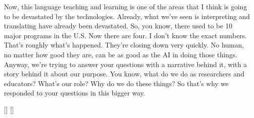 \documentclass[english]{textolivre}
\begin{document}
{    Now, this language teaching and learning is one of the areas that I think is going to be devastated by the technologies. Already, what we’ve seen is interpreting and translating have already been devastated. So, you know, there used to be 10 major programs in the U.S. Now there are four. I don’t know the exact numbers. That’s roughly what’s happened. They’re closing down very quickly. No human, no matter how good they are, can be as good as the AI in doing those things. Anyway, we’re trying to answer your questions with a narrative behind it, with a story behind it about our purpose. You know, what do we do as researchers and educators? What’s our role? Why do we do these things? So that’s why we responded to your questions in this bigger way.
}
    \begin{description}
        \interviewcontent
    \end{description}
\renewcommand{\interviewdate}{\today}
\renewcommand{\interviewcontext}{
    \textbf{Context:} This is a template interview.
}
[\interviewerfname]
[\intervieweefname]
\end{document}
